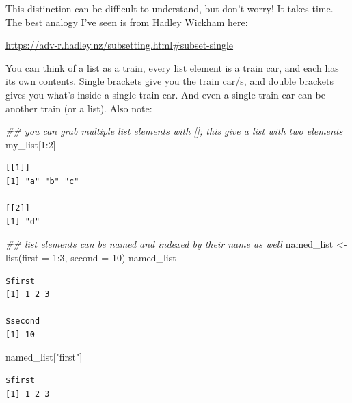 \documentclass[
  letterpaper,
  DIV=11,
  numbers=noendperiod]{scrreprt}
\newenvironment{Shaded}{\begin{snugshade}}{\end{snugshade}}
\newcommand{\AttributeTok}[1]{\textcolor[rgb]{0.40,0.45,0.13}{#1}}
\newcommand{\DecValTok}[1]{\textcolor[rgb]{0.68,0.00,0.00}{#1}}
\newcommand{\DocumentationTok}[1]{\textcolor[rgb]{0.37,0.37,0.37}{\textit{#1}}}
\newcommand{\FunctionTok}[1]{\textcolor[rgb]{0.28,0.35,0.67}{#1}}
\newcommand{\NormalTok}[1]{\textcolor[rgb]{0.00,0.23,0.31}{#1}}
\newcommand{\OtherTok}[1]{\textcolor[rgb]{0.00,0.23,0.31}{#1}}
\newcommand{\SpecialCharTok}[1]{\textcolor[rgb]{0.37,0.37,0.37}{#1}}
\newcommand{\StringTok}[1]{\textcolor[rgb]{0.13,0.47,0.30}{#1}}
\begin{document}
This distinction can be difficult to understand, but don't worry! It
takes time. The best analogy I've seen is from Hadley Wickham here:

\url{https://adv-r.hadley.nz/subsetting.html\#subset-single}

You can think of a list as a train, every list element is a train car,
and each has its own contents. Single brackets give you the train car/s,
and double brackets gives you what's inside a single train car. And even
a single train car can be another train (or a list). Also note:

\begin{Shaded}
\begin{Highlighting}[]
\DocumentationTok{\#\# you can grab multiple list elements with []; this give a list with two elements}
\NormalTok{my\_list[}\DecValTok{1}\SpecialCharTok{:}\DecValTok{2}\NormalTok{]}
\end{Highlighting}
\end{Shaded}

\begin{verbatim}
[[1]]
[1] "a" "b" "c"

[[2]]
[1] "d"
\end{verbatim}

\begin{Shaded}
\begin{Highlighting}[]
\DocumentationTok{\#\# list elements can be named and indexed by their name as well}
\NormalTok{named\_list }\OtherTok{\textless{}{-}} \FunctionTok{list}\NormalTok{(}\AttributeTok{first =} \DecValTok{1}\SpecialCharTok{:}\DecValTok{3}\NormalTok{, }\AttributeTok{second =} \DecValTok{10}\NormalTok{)}
\NormalTok{named\_list}
\end{Highlighting}
\end{Shaded}

\begin{verbatim}
$first
[1] 1 2 3

$second
[1] 10
\end{verbatim}

\begin{Shaded}
\begin{Highlighting}[]
\NormalTok{named\_list[}\StringTok{"first"}\NormalTok{]}
\end{Highlighting}
\end{Shaded}

\begin{verbatim}
$first
[1] 1 2 3
\end{verbatim}
\end{document}
